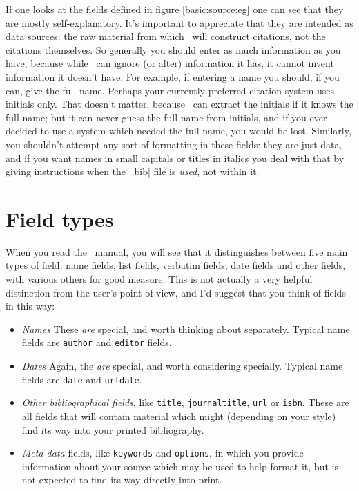 {If one looks at the fields defined in figure \ref{basic:source:eg} one
can see that they are mostly self-explanatory. It's important to
appreciate that they are intended as data sources: the raw material
from which \biblatex\ will construct citations, not the citations
themselves. So generally you should enter as much information as you
have, because while \biblatex\ can ignore (or alter) information it
has, it cannot invent information it doesn't have. For example, if
entering a name you should, if you can, give the full name. Perhaps
your currently-preferred citation system uses initials only. That
doesn't matter, because \biblatex\ can extract the initials if it
knows the full name; but it can never guess the full name from
initials, and if you ever decided to use a system which needed the
full name, you would be lost. Similarly, you shouldn't attempt any
sort of formatting in these fields: they are just data, and if you
want names in small capitals or titles in italics you deal with that
by giving instructions when the |.bib| file is \emph{used}, not within
it.

\section{Field types}

When you read the \biblatex\ manual,
you will see that it distinguishes between five main types of field:
name fields, list fields, verbatim fields, date fields and other
fields, with various others for good measure. This is not actually a
very helpful distinction from the user's point of view, and I'd
suggest that you think of fields in this way:
\begin{itemize}
\item \emph{Names} These \emph{are} special, and worth thinking about
  separately. Typical name fields are \texttt{author} and
  \texttt{editor} fields.
\item \emph{Dates} Again, the \emph{are} special, and worth
  considering specially. Typical name fields are \texttt{date} and
  \texttt{urldate}.
\item \emph{Other bibliographical fields}, like \texttt{title},
  \texttt{journaltitle}, \texttt{url} or \texttt{isbn}. These are all
  fields that will contain material which might (depending on your
  style) find its way into your printed bibliography.
\item \emph{Meta-data} fields, like \texttt{keywords} and
  \texttt{options}, in which you provide information about your source
  which may be used to help format it, but is not expected to find its
  way directly into print.
\end{itemize} 

}
